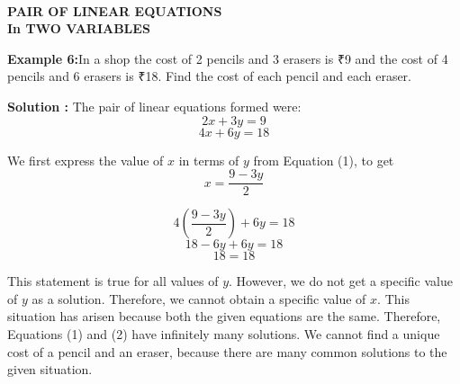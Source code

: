 \documentclass[a4paper,10pt]{article}
\begin{document}
\pagestyle{empty} %

\thispagestyle{fancy} %
\fancyhf{} %
\renewcommand{\headrulewidth}{0pt} %

    \vspace{1cm}
\begin{center}

    {\LARGE \textbf{\textcolor{cyanblue}{\\ PAIR OF LINEAR EQUATIONS\\ In TWO VARIABLES}}}
\end{center}
  \vspace{1cm}   
\textbf{\textcolor{cyanblue}{Example 6:}}In a shop the cost of 2 pencils and 3 erasers is ₹9 and the cost of 4 pencils and 6 erasers is ₹18. Find the cost of each pencil and each eraser.

\textbf{\textcolor{cyanblue}{Solution :}} The pair of linear equations formed were:
\begin{equation}
2x + 3y = 9 \tag{1}
\end{equation}
\begin{equation}
4x + 6y = 18 \tag{2}
\end{equation}
\item We first express the value of \( x \) in terms of \( y \) from Equation (1), to get
\begin{equation}
x = \frac{9 - 3y}{2} \tag{3}
\end{equation}
\begin{enumerate}
    \begin{equation}
    4 \left( \frac{9 - 3y}{2} \right) + 6y = 18 \tag{4}
    \end{equation}
    \begin{equation}
    18 - 6y + 6y = 18 \tag{5}
    \end{equation}
    \begin{equation}
    18 = 18 \tag{6}
    \end{equation}
\end{enumerate}
This statement is true for all values of \( y \). However, we do not get a specific value of \( y \) as a solution. Therefore, we cannot obtain a specific value of \( x \). This situation has arisen because both the given equations are the same. 
Therefore, Equations (1) and (2) have infinitely many solutions. We cannot find a unique cost of a pencil and an eraser, because there are many common solutions to the given situation.
\end{document}

